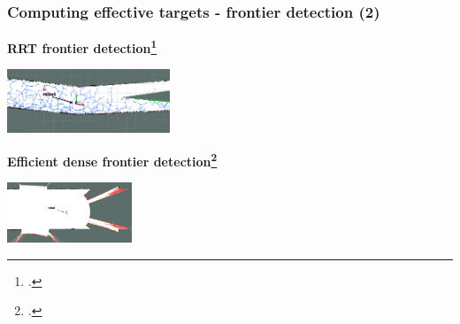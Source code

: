 \begin{frame}
	\frametitle{Computing effective targets - frontier detection (2)}
			\centering
			{\bf{RRT frontier detection\footcite{Umari2017}}}\\ 
				\begin{center}
					\includegraphics[height=1.9cm]{figures/rrt2}
					\label{fig:cent}
				\end{center}
				\centering
				{\bf{Efficient dense frontier detection\footcite{Orsulic2019}}}\\ 
				\begin{center}
					\includegraphics[height=1.8cm]{figures/carto1}
					\label{fig:decent}
				\end{center}
		
\end{frame}
		
